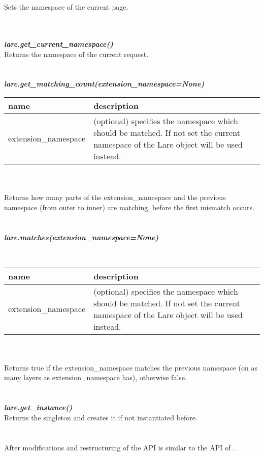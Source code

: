 \\
\\
Sets the namespace of the current page.
\\
\\
\\
\large{\textbf{\textit{lare.get\_current\_namespace()}}
\\
Returns the namespace of the current request.
\\
\\
\\
\large{\textbf{\textit{lare.get\_matching\_count(extension\_namespace=None)}}}
\\
\begin{tabular}{|p{4cm}|p{9cm}|}
    \hline
    \textbf{name} & \textbf{description} \\
    \hline
    extension\_namespace & (optional) specifies the namespace which should be matched. If not set the current namespace of the Lare object will be used instead. \\
    \hline
\end{tabular}
\\
\\
Returns how many parts of the extension\_namespace and the previous namespace (from outer to inner) are matching, before the first mismatch occurs.
\\
\\
\\
\large{\textbf{\textit{lare.matches(extension\_namespace=None)}}}}
\\
\begin{tabular}{|p{4cm}|p{9cm}|}
    \hline
    \textbf{name} & \textbf{description} \\
    \hline
    extension\_namespace & (optional) specifies the namespace which should be matched. If not set the current namespace of the Lare object will be used instead. \\
    \hline
\end{tabular}
\\
\\
Returns true if the extension\_namespace matches the previous namespace (on as many layers as extension\_namespace has), otherwise false.
\\
\\
\\
\large{\textbf{\textit{lare.get\_instance()}}}
\\
Returns the \lare{} singleton and creates it if not instantiated before.
\\
\\
\\
After modifications and restructuring of \djangoLare{} the API is similar to the API of \phpLare{}.


